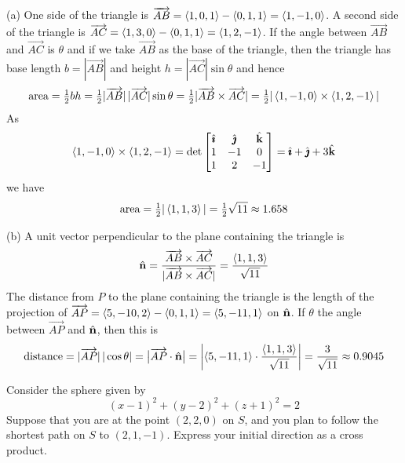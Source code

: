 \begin{solution}
(a) One side of the triangle is 
      $\overrightarrow{AB}=\left< 1,0,1\right> - \left< 0,1,1\right> = \left< 1,-1,0\right>$.
A second side of the triangle is 
      $\overrightarrow{AC}=\left< 1,3,0\right> - \left< 0,1,1\right> = \left< 1,2,-1\right>$.
If the angle between $\overrightarrow{AB}$ and $\overrightarrow{AC}$
is $\theta$ and if we take $\overrightarrow{AB}$ as the base of the triangle,
then the triangle has base length $b=|\overrightarrow{AB}|$
and height $h=|\overrightarrow{AC}|\sin\theta$ and hence
\begin{equation*}
\text{area}=\tfrac{1}{2} bh
=\tfrac{1}{2} |\overrightarrow{AB}|\,|\overrightarrow{AC}|\sin\theta
=\tfrac{1}{2}|\overrightarrow{AB}\times\overrightarrow{AC}|
=\tfrac{1}{2}|\left< 1,-1,0\right> \times \left< 1,2,-1\right>|
\end{equation*}
As
\begin{equation*}
\left< 1,-1,0\right>\times\left< 1,2,-1\right>
=\det\left[\begin{matrix}
           \hat{\pmb{\imath}} & \hat{\pmb{\jmath}} & \hat{\mathbf{k}} \\
            1  &  -1  &  0 \\
            1  &  2   &  -1
  \end{matrix}\right]
=\hat{\pmb{\imath}}+\hat{\pmb{\jmath}}+3\hat{\mathbf{k}}
\end{equation*}
we have 
\begin{equation*}
\text{area}=\tfrac{1}{2}|\left< 1,1,3\right>|=\tfrac{1}{2}\sqrt{11}\approx 1.658
\end{equation*}

(b) A unit vector perpendicular to the plane containing the 
triangle is
\begin{equation*}
\hat{\mathbf{n}}=\frac{\overrightarrow{AB}\times\overrightarrow{AC}}
            {|\overrightarrow{AB}\times\overrightarrow{AC}|}
=\frac{\left< 1,1,3\right>}{\sqrt{11}}
\end{equation*}
The distance from $P$ to the plane containing the triangle is
the length of the projection of 
$\overrightarrow{AP}=\left< 5,-10,2\right>-\left< 0,1,1\right>
               =\left< 5,-11,1\right>$ 
on $\hat{\mathbf{n}}$. If $\theta$ the angle between $\overrightarrow{AP}$
and $\hat{\mathbf{n}}$, then this is
\begin{equation*}
\text{distance}= |\overrightarrow{AP}|\,|\cos\theta| 
=\big|\overrightarrow{AP}\cdot\hat{\mathbf{n}}\big|
=\left|\left< 5,-11,1\right>\cdot\frac{\left< 1,1,3\right>}{\sqrt{11}}\right|
=\frac{3}{\sqrt{11}}\approx 0.9045
\end{equation*}
\end{solution}


\begin{question} [M200 2003A] %
Consider the sphere given by
$$
(x-1)^2+(y-2)^2+(z+1)^2=2
$$
Suppose that you are at the point $(2,2,0)$ on $S$, and you plan to follow
the shortest path on $S$ to $(2,1,-1)$. Express your initial direction
as a cross product.
\end{question}

